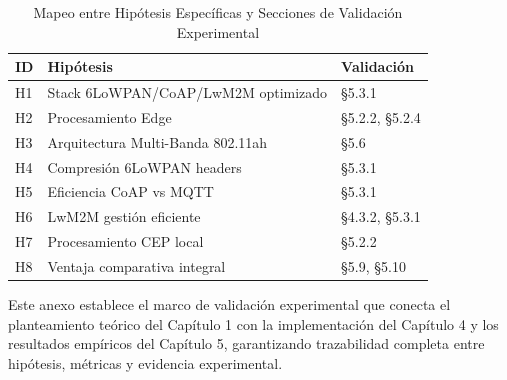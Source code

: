 \begin{table}[h]
\centering
\caption{Mapeo entre Hipótesis Específicas y Secciones de Validación Experimental}
\label{tab:mapeo-hipotesis-validacion}
\begin{tabularx}{\textwidth}{|l|X|l|}
\hline
\textbf{ID} & \textbf{Hipótesis} & \textbf{Validación} \\
\hline
H1 & Stack 6LoWPAN/CoAP/LwM2M optimizado & §5.3.1 \\
\hline
H2 & Procesamiento Edge & §5.2.2, §5.2.4 \\
\hline
H3 & Arquitectura Multi-Banda 802.11ah & §5.6 \\
\hline
H4 & Compresión 6LoWPAN headers & §5.3.1 \\
\hline
H5 & Eficiencia CoAP vs MQTT & §5.3.1 \\
\hline
H6 & LwM2M gestión eficiente & §4.3.2, §5.3.1 \\
\hline
H7 & Procesamiento CEP local & §5.2.2 \\
\hline
H8 & Ventaja comparativa integral & §5.9, §5.10 \\
\hline
\end{tabularx}
\end{table}

Este anexo establece el marco de validación experimental que conecta el planteamiento teórico del Capítulo 1 con la implementación del Capítulo 4 y los resultados empíricos del Capítulo 5, garantizando trazabilidad completa entre hipótesis, métricas y evidencia experimental.

